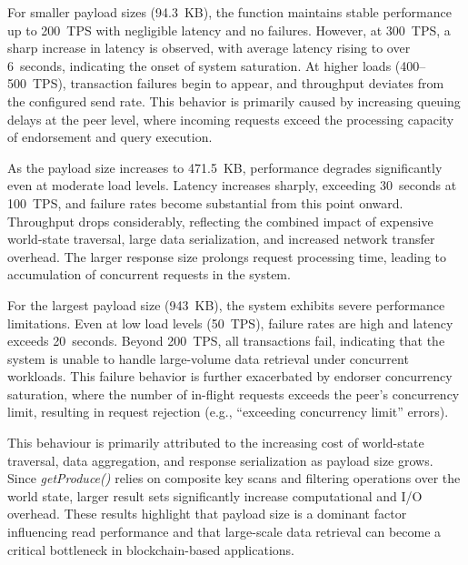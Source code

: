 \documentclass[12pt]{article}
\begin{document}
	For smaller payload sizes (94.3~KB), the function maintains stable performance up to 200~TPS with negligible latency and no failures. However, at 300~TPS, a sharp increase in latency is observed, with average latency rising to over 6~seconds, indicating the onset of system saturation. At higher loads (400--500~TPS), transaction failures begin to appear, and throughput deviates from the configured send rate. This behavior is primarily caused by increasing queuing delays at the peer level, where incoming requests exceed the processing capacity of endorsement and query execution.
	
	As the payload size increases to 471.5~KB, performance degrades significantly even at moderate load levels. Latency increases sharply, exceeding 30~seconds at 100~TPS, and failure rates become substantial from this point onward. Throughput drops considerably, reflecting the combined impact of expensive world-state traversal, large data serialization, and increased network transfer overhead. The larger response size prolongs request processing time, leading to accumulation of concurrent requests in the system.
	
	For the largest payload size (943~KB), the system exhibits severe performance limitations. Even at low load levels (50~TPS), failure rates are high and latency exceeds 20~seconds. Beyond 200~TPS, all transactions fail, indicating that the system is unable to handle large-volume data retrieval under concurrent workloads. This failure behavior is further exacerbated by endorser concurrency saturation, where the number of in-flight requests exceeds the peer’s concurrency limit, resulting in request rejection (e.g., ``exceeding concurrency limit'' errors).
	
	This behaviour is primarily attributed to the increasing cost of world-state traversal, data aggregation, and response serialization as payload size grows. Since \textit{getProduce()} relies on composite key scans and filtering operations over the world state, larger result sets significantly increase computational and I/O overhead. These results highlight that payload size is a dominant factor influencing read performance and that large-scale data retrieval can become a critical bottleneck in blockchain-based applications.
	
\end{document}
